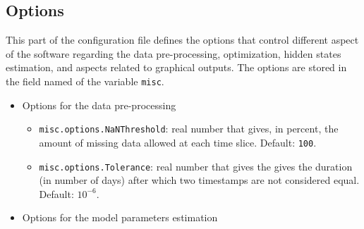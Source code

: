 \subsection{Options}
\label{SS:options}
This part of the configuration file defines the options that control different aspect of the software regarding the data pre-processing, optimization, hidden states estimation, and aspects related to graphical outputs.
The options are stored in the field named  of the \MATLAB{} variable \lstinline[basicstyle = \mlttfamily \small ]!misc!.
\begin{itemize}

\item Options for the data pre-processing

\begin{itemize}
\item \lstinline[basicstyle = \mlttfamily \small ]!misc.options.NaNThreshold!: real number that gives, in percent, the amount of missing data allowed at each time slice. Default: \lstinline[basicstyle = \mlttfamily \small ]!100!.
\item \lstinline[basicstyle = \mlttfamily \small ]!misc.options.Tolerance!: real number that gives the gives the duration (in number of days) after which two timestamps are not considered equal. Default: $10^{-6}$.

\end{itemize}


\item Options for the model parameters estimation


\end{itemize}
